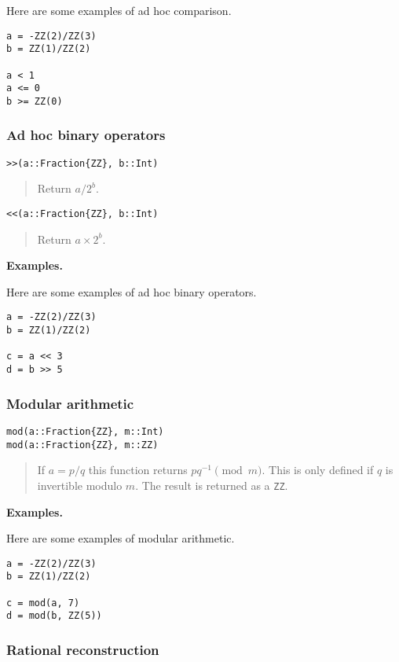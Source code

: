 \documentclass[a4paper,10pt]{article}
\newcommand{\code}{\lstinline}
\newcommand{\desc}[1]{\vspace{-3mm}\begin{quote}#1\end{quote}}
\begin{document}
{{Here are some examples of ad hoc comparison.

\begin{lstlisting}
a = -ZZ(2)/ZZ(3)
b = ZZ(1)/ZZ(2)

a < 1
a <= 0
b >= ZZ(0)
\end{lstlisting}

\subsubsection{Ad hoc binary operators}

\begin{lstlisting}
>>(a::Fraction{ZZ}, b::Int)
\end{lstlisting}

\desc{Return $a/2^b$.}

\begin{lstlisting}
<<(a::Fraction{ZZ}, b::Int)
\end{lstlisting}

\desc{Return $a\times 2^b$.}

\textbf{Examples.}

Here are some examples of ad hoc binary operators.

\begin{lstlisting}
a = -ZZ(2)/ZZ(3)
b = ZZ(1)/ZZ(2)

c = a << 3
d = b >> 5
\end{lstlisting}

\subsubsection{Modular arithmetic}

\begin{lstlisting}
mod(a::Fraction{ZZ}, m::Int)
mod(a::Fraction{ZZ}, m::ZZ)
\end{lstlisting}

\desc{If $a = p/q$ this function returns $pq^{-1} \pmod{m}$. This is only
defined if $q$ is invertible modulo $m$. The result is returned as a \code{ZZ}.}

\textbf{Examples.}

Here are some examples of modular arithmetic.

\begin{lstlisting}
a = -ZZ(2)/ZZ(3)
b = ZZ(1)/ZZ(2)

c = mod(a, 7)
d = mod(b, ZZ(5))
\end{lstlisting}

\subsubsection{Rational reconstruction}

}}
\end{document}
